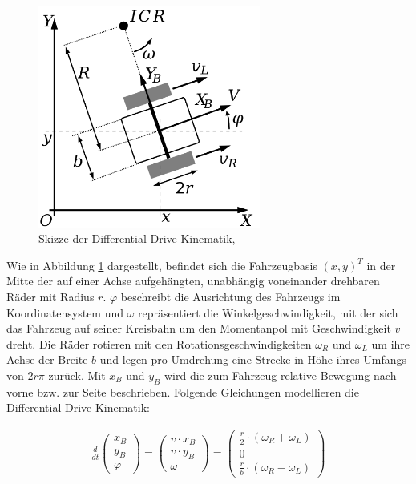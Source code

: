 \begin{figure}[h]
  \centering
  \includegraphics[width = 0.65\textwidth]{imgs/diff_drive}
  \caption{Skizze der Differential Drive Kinematik, \cite{mrdrno2023diffdriveimg}}
  \label{img:DiffDrive}
\end{figure}

Wie in Abbildung \ref{img:DiffDrive} dargestellt, befindet sich die Fahrzeugbasis
$(x, y)^T$ in der Mitte der auf einer Achse aufgehängten, unabhängig voneinander
drehbaren Räder mit Radius $r$. $\varphi$ beschreibt die Ausrichtung des Fahrzeugs
im Koordinatensystem und $\omega$ repräsentiert die Winkelgeschwindigkeit, mit der
sich das Fahrzeug auf seiner Kreisbahn um den Momentanpol mit Geschwindigkeit $v$
dreht. Die Räder rotieren mit den Rotationsgeschwindigkeiten $\omega_R$ und $\omega_L$
um ihre Achse der Breite $b$ und legen pro Umdrehung eine Strecke in Höhe ihres
Umfangs von $2r\pi$ zurück. Mit $x_B$ und $y_B$ wird die zum Fahrzeug relative
Bewegung nach vorne bzw. zur Seite beschrieben. Folgende Gleichungen modellieren
die Differential Drive Kinematik:

\begin{equation}
\begin{aligned}
\frac{d}{dt} \begin{pmatrix} x_B \\ y_B \\ \varphi \end{pmatrix}
= \begin{pmatrix} v \cdot x_B \\ v \cdot y_B \\ \omega \end{pmatrix}
= \begin{pmatrix} \frac{r}{2} \cdot (\omega_R + \omega_L) \\ 0
     \\ \frac{r}{b} \cdot (\omega_R - \omega_L) \end{pmatrix}
\end{aligned}
\end{equation}


